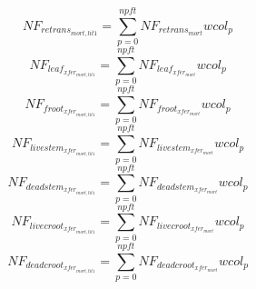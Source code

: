 \begin{equation}
  NF_{retrans_{mort,lit1}}=\sum_{p=0}^{npft}{NF_{retrans_{mort}}{wcol_p}}
\end{equation}
\begin{equation}
  NF_{leaf_{{xfer}_{mort,lit1}}}=\sum_{p=0}^{npft}{NF_{{leaf}_{xfer_{mort}}}{wcol_p}}
\end{equation}
\begin{equation}
  NF_{froot_{xfer_{mort,lit1}}}=\sum_{p=0}^{npft}{NF_{froot_{xfer_{mort}}}}{wcol_p}
\end{equation}
\begin{equation}
  NF_{livestem_{xfer_{mort,lit1}}}=\sum_{p=0}^{npft}{NF_{livestem_{xfer_{mort}}}{wcol_p}}
\end{equation}
\begin{equation}
NF_{deadstem_{xfer_{mort,lit1}}}=\sum_{p=0}^{npft}{NF_{deadstem_{xfer_{mort}}}{wcol_p}}
\end{equation}
\begin{equation}
  NF_{livecroot_{xfer_{mort,lit1}}}=\sum_{p=0}^{npft}{NF_{livecroot_{xfer_{mort}}}{wcol_p}}
\end{equation}
\begin{equation}
  NF_{deadcroot_{xfer_{mort,lit1}}}=\sum_{p=0}^{npft}{NF_{deadcroot_{xfer_{mort}}}{wcol_p}}
\end{equation}

